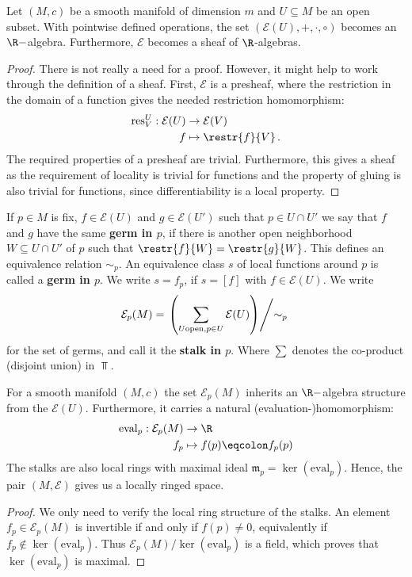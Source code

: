 \begin{corollary}
	Let $(M,c)$ be a smooth manifold of dimension $m$ and $U\subseteq M$ be an open subset. With pointwise defined operations, the set $(\mathcal{E}(U),+,\cdot,\circ)$ becomes an $\R-$algebra. Furthermore, $\mathcal{E}$ becomes a sheaf of $\R$-algebras.
\end{corollary}
\begin{proof}
	There is not really a need for a proof. However, it might help to work through the definition of a sheaf. First, $\mathcal{E}$ is a presheaf, where the restriction in the domain of a function gives the needed restriction homomorphism:
	\begin{align*}
		\text{res}^U_V: \mathcal{E}(U) &\to \mathcal{E}(V) \\
		f &\mapsto \restr{f}{V} \, .
	\end{align*} The required properties of a presheaf are trivial. Furthermore, this gives a sheaf as the requirement of locality is trivial for functions and the property of gluing is also trivial for functions, since differentiability is a local property.
\end{proof}
\begin{definition}
	If $p\in M$ is fix, $f\in \mathcal{E}(U)$ and $g\in \mathcal{E}(U')$ such that $p\in U\cap U'$ we say that $f$ and $g$ have the same \textbf{germ in $p$}, if there is another open neighborhood $W\subseteq U\cap U'$ of $p$ such that $\restr{f}{W}=\restr{g}{W}$. This defines an equivalence relation $\sim_p$. An equivalence class $s$ of local functions around $p$ is called a \textbf{germ in $p$}. We write $s=f_p$, if $s=[f]$ with $f\in \mathcal{E}(U)$. 
	We write 
	\begin{align*}
		\mathcal{E}_p(M)=\left. \left( \sum_{U \text{open},p\in U }\mathcal{E}(U)\right)\middle/ \sim_p \right. \, 
	\end{align*} for the set of germs, and call it the \textbf{stalk in $p$}. Where $\sum$ denotes the co-product (disjoint union) in $\Top$.
\end{definition}
\begin{corollary}
	For a smooth manifold $(M,c)$ the set $\mathcal{E}_p(M)$ inherits an $\R-$algebra structure from the $\mathcal{E}(U)$. Furthermore, it carries a natural (evaluation-)homomorphism:
	\begin{align*}
		\mathrm{eval}_p: \mathcal{E}_p(M) & \to \R \\
		f_p  & \mapsto f(p)\eqcolon f_p(p)
	\end{align*}
	The stalks are also local rings with maximal ideal $\mathfrak{m}_p=\ker(\mathrm{eval}_p)$. Hence, the pair $(M,\mathcal{E})$ gives us a locally ringed space.
\end{corollary}
\begin{proof}
	We only need to verify the local ring structure of the stalks. An element $f_p\in \mathcal{E}_p(M)$ is invertible if and only if $f(p)\neq 0$, equivalently if $f_p\notin \ker(\mathrm{eval}_p)$. Thus $\mathcal{E}_p(M) \big/ \ker(\mathrm{eval}_p)$ is a field, which proves that $\ker(\mathrm{eval}_p)$ is maximal.
\end{proof}



